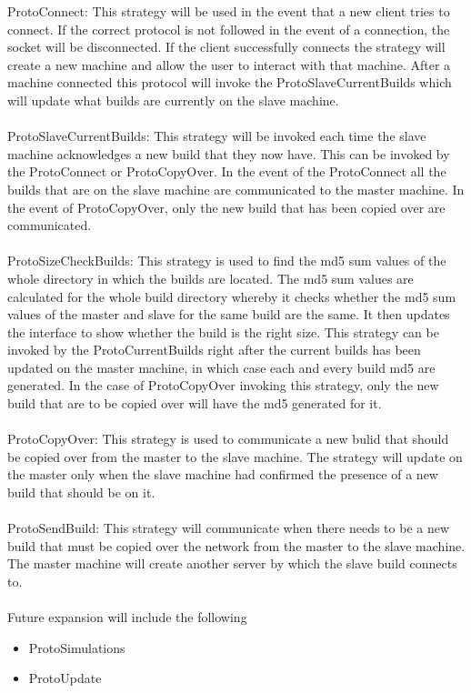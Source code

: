 \documentclass[a4paper,12pt,final]{article}
\begin{document}
ProtoConnect: This strategy will be used in the event that a new client tries to connect. If 
the correct protocol is not followed in the event of a connection, the socket will be disconnected.
If the client successfully connects the strategy will create a new machine and allow the user to
interact with that machine. After a machine connected this protocol will invoke the ProtoSlaveCurrentBuilds
which will update what builds are currently on the slave machine.
\\
\textbf{\\}
ProtoSlaveCurrentBuilds: This strategy will be invoked each time the slave machine 
acknowledges a new build that they now have. This can be invoked by the ProtoConnect or
ProtoCopyOver. In the event of the ProtoConnect all the builds that are on the slave machine are
communicated to the master machine. In the event of ProtoCopyOver, only the new build that
has been copied over are communicated.
\\
\textbf{\\}
ProtoSizeCheckBuilds: This strategy is used to find the md5 sum values of the whole 
directory in which the builds are located. The md5 sum values are calculated for the whole
build directory whereby it checks whether the md5 sum values of the master and slave for the
same build are the same. It then updates the interface to show whether the build is the right size. 
This strategy can be invoked by the ProtoCurrentBuilds right after the current builds has been
updated on the master machine, in which case each and every build md5 are generated. In the case
of ProtoCopyOver invoking this strategy, only the new build that are to be copied over will have the md5
generated for it.
\\
\textbf{\\}
ProtoCopyOver: This strategy is used to communicate a new bulid that should be copied over
from the master to the slave machine. The strategy will update on the master only when the
slave machine had confirmed the presence of a new build that should be on it. 
\\
\textbf{\\}
ProtoSendBuild: This strategy will communicate when there needs to be a new build that
must be copied over the network from the master to the slave machine. The master machine will
create another server by which the slave build connects to.
\\
\textbf{\\}
Future expansion will include the following
\begin{itemize}
\item ProtoSimulations
\item ProtoUpdate
\end{itemize}
\end{document}
